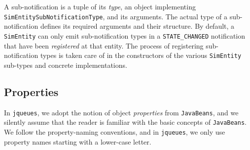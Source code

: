 A sub-notification is a tuple of its {\em type\/},
  an object implementing \lstinline|SimEntitySubNotificationType|,
  and its arguments.
The actual type of a sub-notification
  defines its required arguments and their structure.
By default,
  a \lstinline|SimEntity| can only emit
  sub-notification types in a \lstinline|STATE_CHANGED|
  notification that have been {\em registered\/}
  at that entity.
The process of registering sub-notification types
  is taken care of in the constructors
  of the various \lstinline|SimEntity|
  sub-types and concrete implementations.
  
\subsection{Properties}

In \lstinline|jqueues|,
  we adopt the notion of object {\em properties\/}
  from \lstinline|JavaBeans|,
  and we silently assume that the reader
  is familiar with the basic concepts
  of \lstinline|JavaBeans|.
We follow the property-naming conventions,
  and in \lstinline|jqueues|,
  we only use property names starting
  with a lower-case letter.

